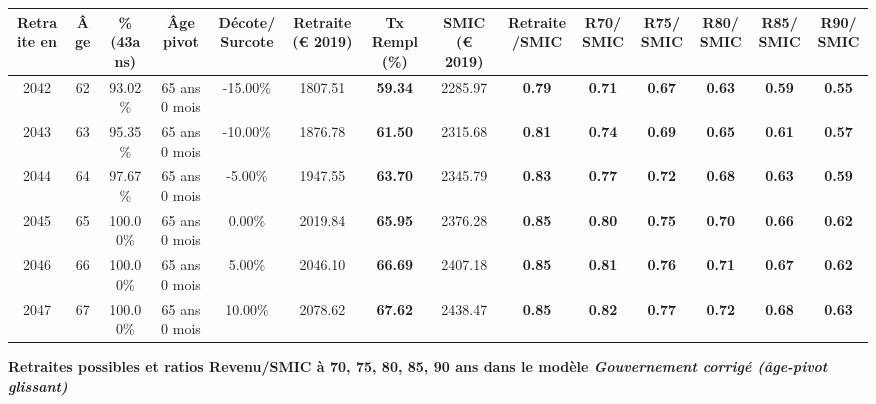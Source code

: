 \begin{adjustbox}{max width=\textwidth} 
\begin{tabular}[htb]{|c|c||c|c|c||c|c||c|c||c|c|c|c|c|} 
\hline 
 Retraite en &  Âge &  \%(43ans) &  Âge pivot &  Décote/Surcote &  Retraite (\euro{} 2019) &  Tx Rempl(\%) &  SMIC (\euro{} 2019) &  Retraite/SMIC &  R70/SMIC &  R75/SMIC &  R80/SMIC &  R85/SMIC &  R90/SMIC \\ 
\hline \hline 
 2042 &  62 &  93.02\% &  65 ans 0 mois &  -15.00\% &  1807.51 &  {\bf 59.34} &  2285.97 &  {\bf {\color{red} 0.79}} &  {\bf {\color{red} 0.71}} &  {\bf {\color{red} 0.67}} &  {\bf {\color{red} 0.63}} &  {\bf {\color{red} 0.59}} &  {\bf {\color{red} 0.55}} \\ 
\hline 
 2043 &  63 &  95.35\% &  65 ans 0 mois &  -10.00\% &  1876.78 &  {\bf 61.50} &  2315.68 &  {\bf {\color{red} 0.81}} &  {\bf {\color{red} 0.74}} &  {\bf {\color{red} 0.69}} &  {\bf {\color{red} 0.65}} &  {\bf {\color{red} 0.61}} &  {\bf {\color{red} 0.57}} \\ 
\hline 
 2044 &  64 &  97.67\% &  65 ans 0 mois &  -5.00\% &  1947.55 &  {\bf 63.70} &  2345.79 &  {\bf {\color{red} 0.83}} &  {\bf {\color{red} 0.77}} &  {\bf {\color{red} 0.72}} &  {\bf {\color{red} 0.68}} &  {\bf {\color{red} 0.63}} &  {\bf {\color{red} 0.59}} \\ 
\hline 
 2045 &  65 &  100.00\% &  65 ans 0 mois &  0.00\% &  2019.84 &  {\bf 65.95} &  2376.28 &  {\bf {\color{red} 0.85}} &  {\bf {\color{red} 0.80}} &  {\bf {\color{red} 0.75}} &  {\bf {\color{red} 0.70}} &  {\bf {\color{red} 0.66}} &  {\bf {\color{red} 0.62}} \\ 
\hline 
 2046 &  66 &  100.00\% &  65 ans 0 mois &  5.00\% &  2046.10 &  {\bf 66.69} &  2407.18 &  {\bf {\color{red} 0.85}} &  {\bf {\color{red} 0.81}} &  {\bf {\color{red} 0.76}} &  {\bf {\color{red} 0.71}} &  {\bf {\color{red} 0.67}} &  {\bf {\color{red} 0.62}} \\ 
\hline 
 2047 &  67 &  100.00\% &  65 ans 0 mois &  10.00\% &  2078.62 &  {\bf 67.62} &  2438.47 &  {\bf {\color{red} 0.85}} &  {\bf {\color{red} 0.82}} &  {\bf {\color{red} 0.77}} &  {\bf {\color{red} 0.72}} &  {\bf {\color{red} 0.68}} &  {\bf {\color{red} 0.63}} \\ 
\hline 
\hline 
\end{tabular} 
\end{adjustbox} 
 
 \vspace{0.1cm} 
{\bf \noindent Retraites possibles et ratios Revenu/SMIC à 70, 75, 80, 85, 90 ans dans le modèle \emph{Gouvernement corrigé (âge-pivot glissant)}}  
 
